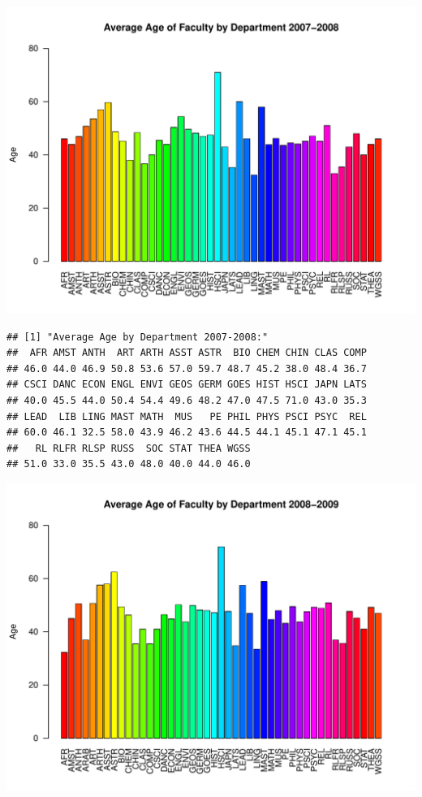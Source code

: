 \documentclass[12pt,a4paper]{article}\usepackage[]{graphicx}\usepackage[]{color}
\makeatletter
\def\maxwidth{ %
  \ifdim\Gin@nat@width>\linewidth
    \linewidth
  \else
    \Gin@nat@width
  \fi
}
\newenvironment{kframe}{%
 \def\at@end@of@kframe{}%
 \ifinner\ifhmode%
  \def\at@end@of@kframe{\end{minipage}}%
  \begin{minipage}{\columnwidth}%
 \fi\fi%
 \def\FrameCommand##1{\hskip\@totalleftmargin \hskip-\fboxsep
 \colorbox{shadecolor}{##1}\hskip-\fboxsep
     \hskip-\linewidth \hskip-\@totalleftmargin \hskip\columnwidth}%
 \MakeFramed {\advance\hsize-\width
   \@totalleftmargin\z@ \linewidth\hsize
   \@setminipage}}%
 {\par\unskip\endMakeFramed%
 \at@end@of@kframe}
\newenvironment{knitrout}{}{} %
\theoremstyle{definition}
\makeatother
\begin{document}
\begin{knitrout}
\includegraphics[width=\maxwidth]{figure/unnamed-chunk-10-4} 
\begin{kframe}\begin{verbatim}
## [1] "Average Age by Department 2007-2008:"
##  AFR AMST ANTH  ART ARTH ASST ASTR  BIO CHEM CHIN CLAS COMP 
## 46.0 44.0 46.9 50.8 53.6 57.0 59.7 48.7 45.2 38.0 48.4 36.7 
## CSCI DANC ECON ENGL ENVI GEOS GERM GOES HIST HSCI JAPN LATS 
## 40.0 45.5 44.0 50.4 54.4 49.6 48.2 47.0 47.5 71.0 43.0 35.3 
## LEAD  LIB LING MAST MATH  MUS   PE PHIL PHYS PSCI PSYC  REL 
## 60.0 46.1 32.5 58.0 43.9 46.2 43.6 44.5 44.1 45.1 47.1 45.1 
##   RL RLFR RLSP RUSS  SOC STAT THEA WGSS 
## 51.0 33.0 35.5 43.0 48.0 40.0 44.0 46.0
\end{verbatim}
\end{kframe}
\includegraphics[width=\maxwidth]{figure/unnamed-chunk-10-5} 

\end{knitrout}
\end{document}
